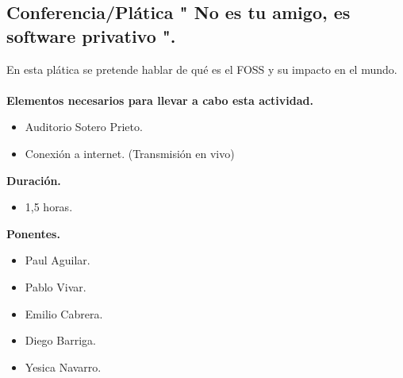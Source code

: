 \documentclass[a4paper,11pt]{article}                 %
\begin{document}
    \vspace{1 cm}
  

  
      \subsection{Conferencia/Plática " No es tu amigo, es software privativo ".}                                     %

   En esta plática se pretende hablar de qué es el FOSS y su impacto en el mundo. 
      \paragraph{}
  \textbf{Elementos necesarios para llevar a cabo esta actividad.}
  \begin{itemize}
    \label{list:sl}
    \item Auditorio Sotero Prieto.
        \item Conexión a internet. (Transmisión en vivo)
  \end{itemize}
  
  \textbf{Duración.}
  \begin{itemize}
    \item 1,5 horas.
  \end{itemize}
  
            \textbf{Ponentes.}
  \begin{itemize}
    \item Paul Aguilar.
    \item Pablo Vivar.
    \item Emilio Cabrera.
    \item Diego Barriga.
    \item Yesica Navarro.
  \end{itemize}
  
  \thispagestyle{empty}
    \newpage                                            %
\end{document}
